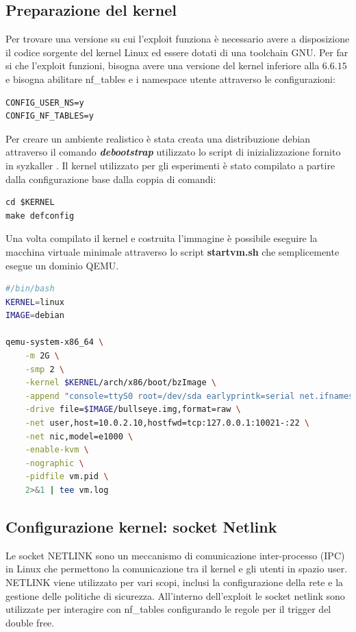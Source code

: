 \documentclass{article}
\begin{document}
\clearpage
\subsection{Preparazione del kernel}
Per trovare una versione su cui l'exploit funziona è necessario avere a disposizione il codice 
sorgente del kernel Linux ed essere dotati di una toolchain GNU. Per far si che l'exploit 
funzioni, bisogna avere una versione del kernel inferiore alla $6.6.15$ e bisogna abilitare 
nf\_tables e i namespace utente attraverso le configurazioni:
\begin{verbatim}
CONFIG_USER_NS=y 
CONFIG_NF_TABLES=y
\end{verbatim}

Per creare un ambiente realistico è stata creata una distribuzione debian attraverso 
il comando \textbf{\textit{debootstrap}} utilizzato lo script di inizializzazione fornito 
in syzkaller \cite{InitScripts}. Il kernel utilizzato per gli esperimenti è stato compilato 
a partire dalla configurazione base dalla coppia di comandi:

\begin{verbatim}
cd $KERNEL
make defconfig
\end{verbatim}

Una volta compilato il kernel e costruita l'immagine è possibile eseguire la macchina virtuale 
minimale attraverso lo script \textbf{startvm.sh} che semplicemente esegue un dominio QEMU.

\begin{lstlisting}[language=bash,caption="Esecuzione della macchina virtuale vittima"]
#/bin/bash
KERNEL=linux
IMAGE=debian

qemu-system-x86_64 \
	-m 2G \
	-smp 2 \
	-kernel $KERNEL/arch/x86/boot/bzImage \
	-append "console=ttyS0 root=/dev/sda earlyprintk=serial net.ifnames=0" \
	-drive file=$IMAGE/bullseye.img,format=raw \
	-net user,host=10.0.2.10,hostfwd=tcp:127.0.0.1:10021-:22 \
	-net nic,model=e1000 \
	-enable-kvm \
	-nographic \
	-pidfile vm.pid \
	2>&1 | tee vm.log 
\end{lstlisting}
\subsection{Configurazione kernel: socket Netlink}
Le socket NETLINK sono un meccanismo di comunicazione inter-processo (IPC) in Linux che 
permettono la comunicazione tra il kernel e gli utenti in spazio user. NETLINK viene utilizzato
per vari scopi, inclusi la configurazione della rete e la gestione delle politiche di 
sicurezza. All'interno dell'exploit le socket netlink sono utilizzate per interagire con 
nf\_tables configurando le regole per il trigger del double free. 
\end{document}
